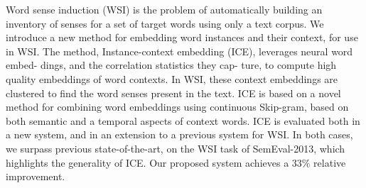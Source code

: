 Word sense induction (WSI) is the problem of automatically building an inventory of senses for a set of target words using only a text corpus. We introduce a new method for embedding word instances and their context, for use in WSI. The method, Instance-context embedding (ICE), leverages neural word embed- dings, and the correlation statistics they cap- ture, to compute high quality embeddings of word contexts. In WSI, these context embeddings are clustered to find the word senses present in the text. ICE is based on a novel method for combining word embeddings using continuous Skip-gram, based on both semantic and a temporal aspects of context words. ICE is evaluated both in a new system, and in an extension to a previous system for WSI. In both cases, we surpass previous state-of-the-art, on the WSI task of SemEval-2013, which highlights the generality of ICE. Our proposed system achieves a 33\% relative improvement.
